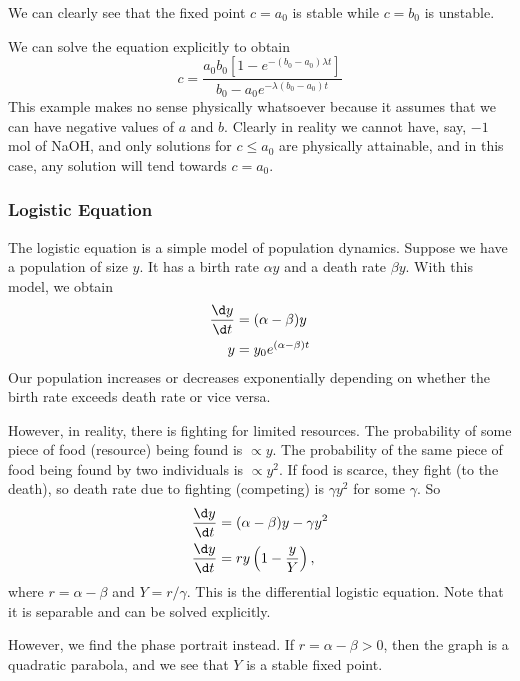 \documentclass[a4paper]{article}
\begin{document}
\begin{eg}
    We can clearly see that the fixed point $c = a_0$ is stable while $c = b_0$ is unstable.

    \note We can solve the equation explicitly to obtain 
    \[
      c = \frac{a_0b_0[1 - e^{-(b_0 - a_0)\lambda t}]}{b_0 - a_0e^{-\lambda(b_0-a_0)t}}
    \]
    \note This example makes no sense physically whatsoever because it assumes that we can have negative values of $a$ and $b$. Clearly in reality we cannot have, say, $-1$ mol of NaOH, and only solutions for $c \leq a_0$ are physically attainable, and in this case, any solution will tend towards $c = a_0$.
  \end{eg}

  \subsubsection{Logistic Equation}
  The logistic equation is a simple model of population dynamics. Suppose we have a population of size $y$. It has a birth rate $\alpha y$ and a death rate $\beta y$. With this model, we obtain
  \begin{align*}
    \frac{\d y}{\d t} &= (\alpha - \beta)y\\
    y &= y_0 e^{(\alpha - \beta)t}
  \end{align*}
  Our population increases or decreases exponentially depending on whether the birth rate exceeds death rate or vice versa.

  However, in reality, there is fighting for limited resources. The probability of some piece of food (resource) being found is $\propto y$. The probability of the same piece of food being found by two individuals is $\propto y^2$. If food is scarce, they fight (to the death), so death rate due to fighting (competing) is $\gamma y^2$ for some $\gamma$. So
  \begin{align*}
    \frac{\d y}{\d t} &= (\alpha - \beta)y - \gamma y^2\\
    \frac{\d y}{\d t}&= ry \left(1 - \frac{y}{Y}\right),
  \end{align*}
  where $r = \alpha - \beta$ and $Y = r/\gamma$. This is the differential logistic equation. Note that it is separable and can be solved explicitly.

  However, we find the phase portrait instead. If $r = \alpha - \beta > 0$, then the graph is a quadratic parabola, and we see that $Y$ is a stable fixed point.

  \begin{center}
  \end{center}
\end{document}
